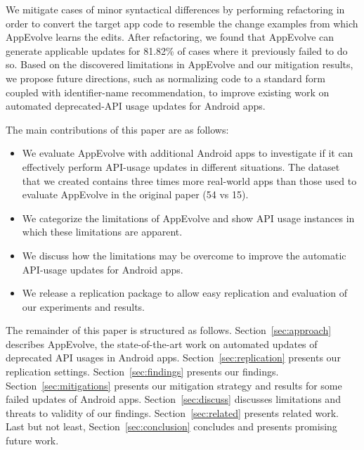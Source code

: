 We mitigate cases of minor syntactical differences by performing refactoring in order to convert the target app code to resemble the change examples from which AppEvolve learns the edits.
After refactoring, we found that AppEvolve can generate applicable updates for 81.82\% of cases where it previously failed to do so.
Based on the discovered limitations in AppEvolve and our mitigation results, we propose future directions, such as normalizing code to a standard form coupled with identifier-name recommendation, to improve existing work on automated deprecated-API usage updates for Android apps.

The main contributions of this paper are as follows:
\begin{itemize}
	\item We  evaluate AppEvolve with additional Android apps to investigate if it can effectively perform API-usage updates in different situations. The dataset that we created contains three times more real-world apps than those used to evaluate AppEvolve in the original paper (54 vs 15).
	\item We categorize the limitations of AppEvolve and show API usage instances in which these limitations are apparent.
	\item We discuss how the limitations may be overcome to improve the automatic API-usage updates for Android apps.
	\item We release a replication package to allow easy replication and evaluation of our experiments and results.%
\end{itemize}

The remainder of this paper is structured as follows. Section~\ref{sec:approach} describes AppEvolve, the state-of-the-art work on automated updates of deprecated API usages in Android apps. Section~\ref{sec:replication} presents our replication settings. Section~\ref{sec:findings} presents our findings. Section~\ref{sec:mitigations} presents our mitigation strategy and results for some failed updates of Android apps.
Section~\ref{sec:discuss} discusses limitations and threats to validity of our findings.
Section~\ref{sec:related} presents related work.
Last but not least, Section~\ref{sec:conclusion} concludes and presents promising future work.
